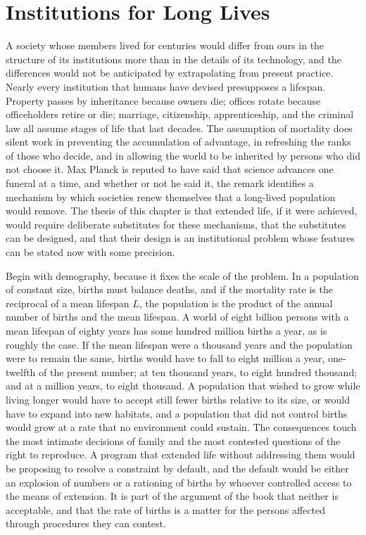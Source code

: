 \chapter{Institutions for Long Lives}
\label{ch:30}

A society whose members lived for centuries would differ from ours in the structure of its institutions more than in the details of its technology, and the differences would not be anticipated by extrapolating from present practice. Nearly every institution that humans have devised presupposes a lifespan. Property passes by inheritance because owners die; offices rotate because officeholders retire or die; marriage, citizenship, apprenticeship, and the criminal law all assume stages of life that last decades. The assumption of mortality does silent work in preventing the accumulation of advantage, in refreshing the ranks of those who decide, and in allowing the world to be inherited by persons who did not choose it. Max Planck is reputed to have said that science advances one funeral at a time, and whether or not he said it, the remark identifies a mechanism by which societies renew themselves that a long-lived population would remove. The thesis of this chapter is that extended life, if it were achieved, would require deliberate substitutes for these mechanisms, that the substitutes can be designed, and that their design is an institutional problem whose features can be stated now with some precision.

Begin with demography, because it fixes the scale of the problem. In a population of constant size, births must balance deaths, and if the mortality rate is the reciprocal of a mean lifespan $L$, the population is the product of the annual number of births and the mean lifespan. A world of eight billion persons with a mean lifespan of eighty years has some hundred million births a year, as is roughly the case. If the mean lifespan were a thousand years and the population were to remain the same, births would have to fall to eight million a year, one-twelfth of the present number; at ten thousand years, to eight hundred thousand; and at a million years, to eight thousand. A population that wished to grow while living longer would have to accept still fewer births relative to its size, or would have to expand into new habitats, and a population that did not control births would grow at a rate that no environment could sustain. The consequences touch the most intimate decisions of family and the most contested questions of the right to reproduce. A program that extended life without addressing them would be proposing to resolve a constraint by default, and the default would be either an explosion of numbers or a rationing of births by whoever controlled access to the means of extension. It is part of the argument of the book that neither is acceptable, and that the rate of births is a matter for the persons affected through procedures they can contest.

